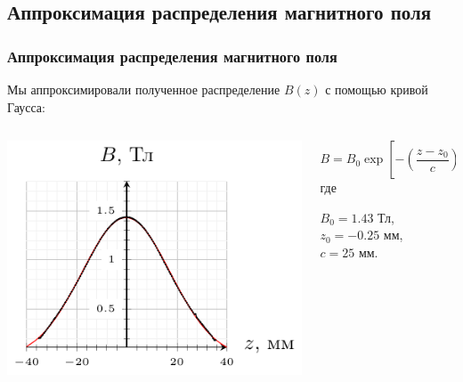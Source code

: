 \documentclass[10pt,pdf,hyperref={unicode}, dvipsnames]{beamer}
\begin{document}
\begin{frame}
	\subsection{Аппроксимация распределения магнитного поля}
	\frametitle{Аппроксимация распределения магнитного поля}
	Мы аппроксимировали полученное распределение $B(z)$ с помощью кривой Гаусса:\vspace{-1em}
	\begin{columns}
		\begin{column}{0.6\textwidth}
			\begin{center}
				\hspace{4em}
				\includegraphics[width=1\textwidth]{images/b_from_z}
			\end{center}
		\end{column}
		\begin{column}[]{0.4\textwidth}
			\begin{equation*} 
				B=B_0%
				\exp 
				\left[
					-\left(
					\frac{z-z_0}{c}
					\right)^2
					\right], 
			\end{equation*}
			где 
			
			$B_0=1.43$ Тл, \\
			$z_0=-0.25$ мм,\\
			$c=25$ мм.
		\end{column}
	\end{columns}
\end{frame}
\end{document}
